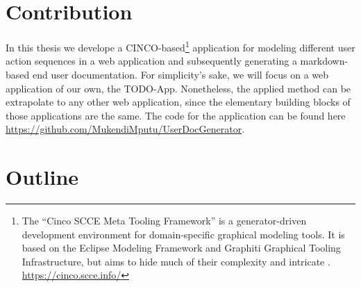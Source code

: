 \section{Contribution}
In this thesis we develope a CINCO-based\footnote{The “Cinco SCCE Meta Tooling Framework” is a generator-driven development environment for domain-specific graphical modeling tools. It is based on the Eclipse Modeling Framework and Graphiti Graphical Tooling Infrastructure, but aims to hide much of their complexity and intricate . \url{https://cinco.scce.info/}} application for modeling different user action sequences in a web application and subsequently generating a markdown-based end user documentation. For simplicity's sake, we will focus on a web application of our own, the TODO-App. Nonetheless, the applied method can be extrapolate to any other web application, since the elementary building blocks of those applications are the same. The code for the application can be found here \url{https://github.com/MukendiMputu/UserDocGenerator}. 
\section{Outline}